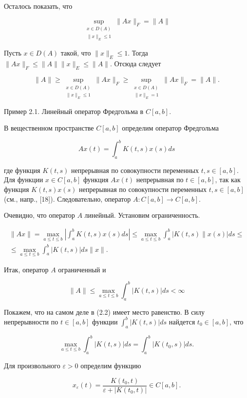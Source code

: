 Осталось показать, что

$$
	\sup _{\substack{x \in D(A) \\\|x\|_{E} \leq 1}}\|A x\|_{F}=\|A\|
$$

Пусть $x \in D(A)$ такой, что $\|x\|_{E} \leq 1$. Тогда $\|A x\|_{F} \leq\|A\|\|x\|_{E} \leq\|A\|$. Отсюда следует

$$
	\|A\| \geq \sup _{\substack{x \in D(A) \\\|x\|_{E} \leq 1}}\|A x\|_{F} \geq \sup _{\substack{x \in D(A) \\\|x\|_{E}=1}}\|A x\|_{F}=\|A\| .
$$

Пример 2.1. Линейный оператор Фредгольма в $C[a, b]$.

В вещественном пространстве $C[a, b]$ определим оператор Фредгольма

$$
	A x(t)=\int_{a}^{b} K(t, s) x(s) d s
$$

где функция $K(t, s)$ непрерывная по совокупности переменных $t, s \in[a, b]$. Для функции $x \in C[a, b]$ функция $A x(t)$ непрерывная по $t \in[a, b]$, так как функция $K(t, s) x(s)$ непрерывная по совокупности переменных $t, s \in[a, b]$ (см., напр., [18]). Следовательно, оператор $A: C[a, b] \rightarrow C[a, b]$.

Очевидно, что оператор $A$ линейный. Установим ограниченность.

$$
	\begin{gathered}
		\|A x\|=\max _{a \leq t \leq b}\left|\int_{a}^{b} K(t, s) x(s) d s\right| \leq \max _{a \leq t \leq b} \int_{a}^{b}|K(t, s) \| x(s)| d s \leq \\
		\leq \max _{a \leq t \leq b} \int_{a}^{b}|K(t, s)| d s\|x\| .
	\end{gathered}
$$

Итак, оператор $A$ ограниченный и

$$
	\|A\| \leq \max _{a \leq t \leq b} \int_{a}^{b}|K(t, s)| d s<\infty
$$

Покажем, что на самом деле в (2.2) имеет место равенство. В силу непрерывности по $t \in[a, b]$ функции $\int_{a}^{b}|K(t, s)| d s$ найдется $t_{0} \in[a, b]$, что

$$
	\max _{a \leq t \leq b} \int_{a}^{b}|K(t, s)| d s=\int_{a}^{b}\left|K\left(t_{0}, s\right)\right| d s .
$$

Для произвольного $\varepsilon>0$ определим функцию

$$
	x_{\varepsilon}(t)=\frac{K\left(t_{0}, t\right)}{\varepsilon+\left|K\left(t_{0}, t\right)\right|} \in C[a, b] .
$$

